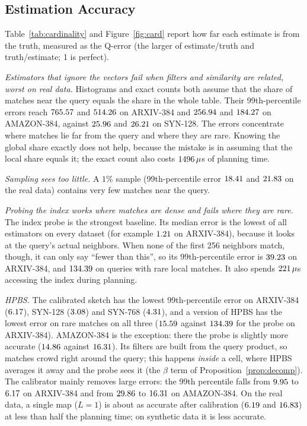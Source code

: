 \documentclass[sigconf, nonacm]{acmart}
\begin{document}
\subsection{Estimation Accuracy}\label{sec:eval_card}
Table~\ref{tab:cardinality} and Figure~\ref{fig:card} report how far each estimate is from the truth, measured as the Q-error (the larger of estimate/truth and truth/estimate; 1 is perfect).

\emph{Estimators that ignore the vectors fail when filters and similarity are related, worst on real data.} Histograms and exact counts both assume that the share of matches near the query equals the share in the whole table. Their 99th-percentile errors reach $765.57$ and $514.26$ on ARXIV-384 and $256.94$ and $184.27$ on AMAZON-384, against $25.96$ and $26.21$ on SYN-128. The errors concentrate where matches lie far from the query and where they are rare. Knowing the global share exactly does not help, because the mistake is in assuming that the local share equals it; the exact count also costs $1496\,\mu$s of planning time.

\emph{Sampling sees too little.} A $1\%$ sample (99th-percentile error $18.41$ and $21.83$ on the real data) contains very few matches near the query.

\emph{Probing the index works where matches are dense and fails where they are rare.} The index probe is the strongest baseline. Its median error is the lowest of all estimators on every dataset (for example $1.21$ on ARXIV-384), because it looks at the query's actual neighbors. When none of the first 256 neighbors match, though, it can only say ``fewer than this'', so its 99th-percentile error is $39.23$ on ARXIV-384, and $134.39$ on queries with rare local matches. It also spends $221\,\mu$s accessing the index during planning.

\emph{HPBS.} The calibrated sketch has the lowest 99th-percentile error on ARXIV-384 ($6.17$), SYN-128 ($3.08$) and SYN-768 ($4.31$), and a version of HPBS has the lowest error on rare matches on all three ($15.59$ against $134.39$ for the probe on ARXIV-384). AMAZON-384 is the exception: there the probe is slightly more accurate ($14.86$ against $16.31$). Its filters are built from the query product, so matches crowd right around the query; this happens \emph{inside} a cell, where HPBS averages it away and the probe sees it (the $\beta$ term of Proposition~\ref{prop:decomp}). The calibrator mainly removes large errors: the 99th percentile falls from $9.95$ to $6.17$ on ARXIV-384 and from $29.86$ to $16.31$ on AMAZON-384. On the real data, a single map ($L=1$) is about as accurate after calibration ($6.19$ and $16.83$) at less than half the planning time; on synthetic data it is less accurate.
\end{document}
